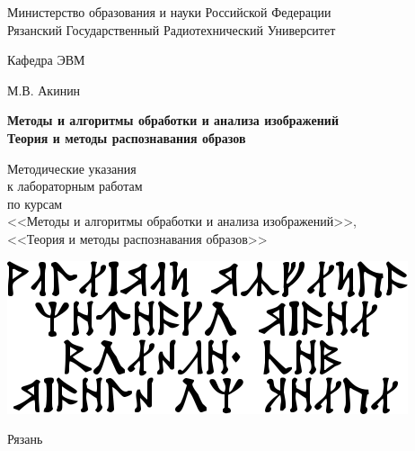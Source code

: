 
\begin{titlepage}

\begin{center}

Министерство образования и науки Российской Федерации \\
Рязанский Государственный Радиотехнический Университет

\bigskip

Кафедра ЭВМ

\vspace{5em}

М.В. Акинин

\vspace{3em}

{\Large \bf Методы и алгоритмы обработки и анализа изображений \\
Теория и методы распознавания образов}

\vspace{3em}

Методические указания\\
к лабораторным работам\\
по курсам \\
<<Методы и алгоритмы обработки и анализа изображений>>, \\
<<Теория и методы распознавания образов>>

\vfill

\includegraphics[]{image/title_cirth.png} %

\vfill

Рязань \the\year

\end{center}

\thispagestyle{empty}

\end{titlepage}

\setcounter{page}{2}

\newpage

